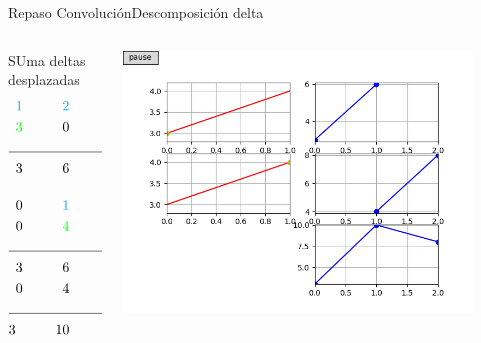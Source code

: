 \begin{frame}{Repaso Convolución}{Descomposición delta}
   \begin{columns}[c]
      \begin{column}{0.4\textwidth}
      \tiny
      SUma deltas desplazadas
            \begin{align*}
               \textcolor{cyan} {1} \hspace{1cm}\textcolor{cyan}{2} \hspace{1cm}0\\
               \textcolor{green}{3} \hspace{1cm}                 0  \hspace{1cm}0\\
               \cline{1-2}
               3\hspace{1cm} 6 \hspace{1cm}0\\[0.4cm]
               0\hspace{1cm}\textcolor{cyan} {1} \hspace{1cm}\textcolor{cyan}{2}\\
               0\hspace{1cm}\textcolor{green}{4} \hspace{1cm}                 0\\
               \cline{1-2}
               3\hspace{1cm} 6 \hspace{1cm}0\\
               0\hspace{1cm} 4 \hspace{1cm}8\\
               \cline{1-2}
               3 \hspace{1cm}10 \hspace{1cm} 8\\
            \end{align*}
      \end{column}
      \hspace{2pt}
      \vrule
      \hspace{2pt}
      \begin{column}{0.6\textwidth}
         \centering\includegraphics[width=0.9\textwidth]{5_clase/conv_as_multiply1}

\end{column}
\end{columns}
\end{frame}
